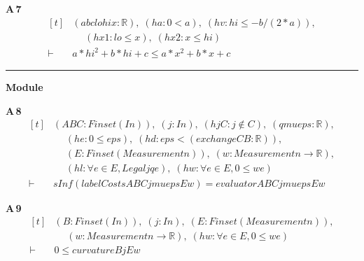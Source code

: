 \noindent\textbf{A\,7}\quad{}
{\footnotesize\[ \begin{aligned}[t]
&(\mathit{a} \mathit{b} \mathit{c} \mathit{lo} \mathit{hi} \mathit{x} : \mathbb{R} ),\; (\mathit{ha} : 0 < \mathit{a}),\; (\mathit{hv} : \mathit{hi} \leq -\mathit{b} / (2 * \mathit{a})),\\
&\quad \; (\mathit{hx1} : \mathit{lo} \leq \mathit{x}),\; (\mathit{hx2} : \mathit{x} \leq \mathit{hi})\\
\vdash\;&\mathit{a} * \mathit{hi} ^{2} + \mathit{b} * \mathit{hi} + \mathit{c} \leq \mathit{a} * \mathit{x} ^{2} + \mathit{b} * \mathit{x} + \mathit{c}
\end{aligned} \]}

\vspace{4pt}\noindent\rule{\columnwidth}{0.4pt}\par\vspace{2pt}
\noindent\textbf{Module }\par\vspace{3pt}

\noindent\textbf{A\,8}\quad{}
{\footnotesize\[ \begin{aligned}[t]
&(\mathit{A} \mathit{B} \mathit{C} : \mathit{Finset} (\mathit{I} \mathit{n})),\; (\mathit{j} : \mathit{I} \mathit{n}),\; (\mathit{hjC} : \mathit{j} \notin \mathit{C}),\; (\mathit{q} \mathit{mu} \mathit{eps} : \mathbb{R} ),\\
&\quad \; (\mathit{he} : 0 \leq \mathit{eps}),\; (\mathit{hd} : \mathit{eps} < (\mathit{exchange} \mathit{C} \mathit{B} : \mathbb{R} )),\\
&\quad \; (\mathit{E} : \mathit{Finset} (\mathit{Measurement} \mathit{n})),\; (\mathit{w} : \mathit{Measurement} \mathit{n} \to \mathbb{R} ),\\
&\quad \; (\mathit{hl} : \forall \mathit{e} \in \mathit{E},\mathit{Legal} \mathit{j} \mathit{q} \mathit{e}),\; (\mathit{hw} : \forall \mathit{e} \in \mathit{E},0 \leq \mathit{w} \mathit{e})\\
\vdash\;&\mathit{sInf} (\mathit{labelCosts} \mathit{A} \mathit{B} \mathit{C} \mathit{j} \mathit{mu} \mathit{eps} \mathit{E} \mathit{w})=\mathit{evaluator} \mathit{A} \mathit{B} \mathit{C} \mathit{j} \mathit{mu} \mathit{eps} \mathit{E} \mathit{w}
\end{aligned} \]}

\noindent\textbf{A\,9}\quad{}
{\footnotesize\[ \begin{aligned}[t]
&(\mathit{B} : \mathit{Finset} (\mathit{I} \mathit{n})),\; (\mathit{j} : \mathit{I} \mathit{n}),\; (\mathit{E} : \mathit{Finset} (\mathit{Measurement} \mathit{n})),\\
&\quad \; (\mathit{w} : \mathit{Measurement} \mathit{n} \to \mathbb{R} ),\; (\mathit{hw} : \forall \mathit{e} \in \mathit{E},0 \leq \mathit{w} \mathit{e})\\
\vdash\;&0 \leq \mathit{curvature} \mathit{B} \mathit{j} \mathit{E} \mathit{w}
\end{aligned} \]}

